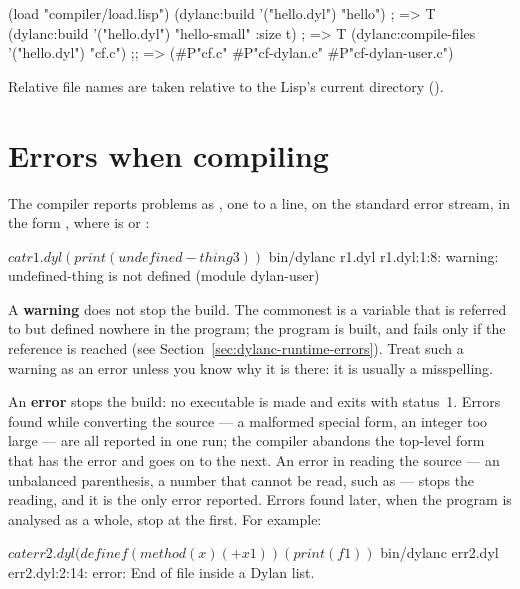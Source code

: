 \begin{lisp}
(load "compiler/load.lisp")
(dylanc:build '("hello.dyl") "hello")              ; => T
(dylanc:build '("hello.dyl") "hello-small" :size t) ; => T
(dylanc:compile-files '("hello.dyl") "cf.c")
;; => (#P"cf.c" #P"cf-dylan.c" #P"cf-dylan-user.c")
\end{lisp}

Relative file names are taken relative to the Lisp's current directory
().

\section{Errors when compiling}\label{sec:dylanc-diagnostics}

The compiler reports problems as , one to a line, on
the standard error stream, in the form \code{:}%
\code{:}\code{: }\code{: }, where
 is  or :

\begin{shell}
$ cat r1.dyl
(print (undefined-thing 3))
$ bin/dylanc r1.dyl
r1.dyl:1:8: warning: undefined-thing is not defined (module dylan-user)
\end{shell}

A \textbf{warning} does not stop the build. The commonest is a variable
that is referred to but defined nowhere in the program; the program is
built, and fails only if the reference is reached (see
Section~\ref{sec:dylanc-runtime-errors}). Treat such a warning as an
error unless you know why it is there: it is usually a misspelling.

An \textbf{error} stops the build: no executable is made and
 exits with status~1. Errors found while converting the
source --- a malformed special form, an integer too large --- are all
reported in one run; the compiler abandons the top-level form that has
the error and goes on to the next. An error in reading the source --- an
unbalanced parenthesis, a number that cannot be read, such as
 --- stops the reading, and it is the only error reported.
Errors found later, when the program is analysed as a whole, stop at the
first. For example:

\begin{shell}
$ cat err2.dyl
(define f (method (x) (+ x 1))
(print (f 1))
$ bin/dylanc err2.dyl
err2.dyl:2:14: error: End of file inside a Dylan list.
\end{shell}

